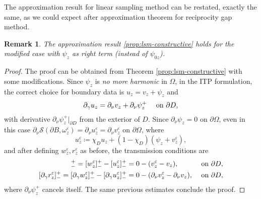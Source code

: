 \documentclass[10pt, a4paper, twoside, openright]{book}
\theoremstyle{definition}
\theoremstyle{plain}
\theoremstyle{plain}
\theoremstyle{plain}
\theoremstyle{plain}
\newtheorem{remark}[subsection]{Remark}
\theoremstyle{plain}
\theoremstyle{plain}
\theoremstyle{plain}
\theoremstyle{plain}
\let\epsilon\varepsilon
\begin{document}
The approximation result for linear sampling method can be restated, exactly the same, as we could expect after approximation theorem for reciprocity gap method.
\begin{remark}
 The approximation result \ref{prop:lsm-constructive} holds for the modified case with $\psi_z$ as right term (instead of $\psi_{0z}$).
\end{remark}
\begin{proof}
 The proof can be obtained from Theorem \ref{prop:lsm-constructive} with some modifications. 
 Since $\psi_z$ is \emph{no more harmonic} in $\Omega$, in the ITP formulation, the correct choice for boundary data is $u_z = v_z + \psi_z$ and
 \begin{equation}
 \partial_\gamma u_z = \partial_\nu v_z + \partial_\nu\psi_z^+ \quad \textup{ on }\partial D,
 \end{equation}
 with derivative $\partial_\nu\psi_z^+|_{\partial D}$ from the exterior of $D$. Since $\partial_\nu\psi_z = 0$ on $\partial \Omega$, even in this case $\partial_\nu\mathcal{S}(\partial B, \omega^\epsilon_z) = \partial_\nu u^\epsilon_z = \partial_\nu v^\epsilon_z$ on $\partial \Omega$, 
 where
 \begin{equation}
   u^\epsilon_z\coloneqq\chi_Du_z + (1-\chi_D)(\psi_{z} + v^\epsilon_z),
 \end{equation}
  and after defining $w^\epsilon_z, r^\epsilon_z$ as before, the transmission conditions are
  \begin{align}
   [r^\epsilon_z]^+_- = [w^\epsilon_z]^+_- -[u^\epsilon_z]^+_- &=0 - (v^\epsilon_z - v_z), && \textup{ on }\partial D, \\
   [\partial_\gamma r^\epsilon_z]^+_- = [\partial_\gamma w^\epsilon_z]^+_- -[\partial_\gamma u^\epsilon_z]^+_-&= 0 - (\partial_\nu v^\epsilon_z - \partial_\nu v_z), && \textup{ on }\partial D, 
  \end{align}
  where $\partial_\nu\psi_z^+$ cancels itself. The same previous estimates conclude the proof.
\end{proof}
\end{document}
